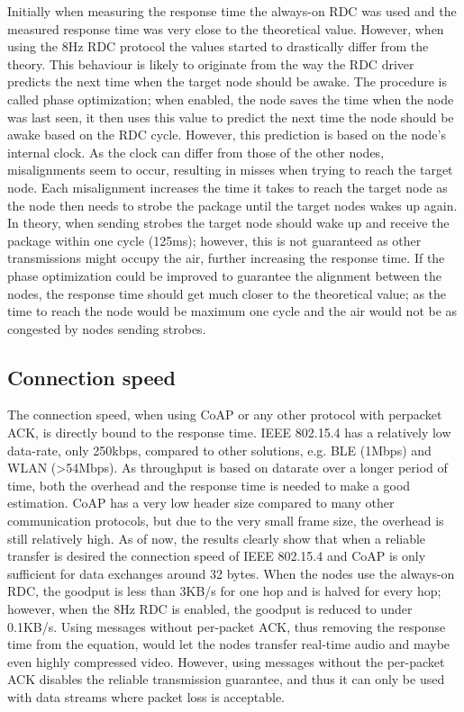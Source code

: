 Initially when measuring the response time the always-on RDC was used and the measured response time was very close to the theoretical value.
However,
	when using the 8Hz RDC protocol the values started to drastically differ from the theory.
This behaviour is likely to originate from the way the RDC driver predicts the next time when the target node should be awake.
The procedure is called phase optimization;
	when enabled,
	the node saves the time when the node was last seen,
	it then uses this value to predict the next time the node should be awake based on the RDC cycle.
However,
	this prediction is based on the node’s internal clock.
As the clock can differ from those of the other nodes,
	misalignments seem to occur,
	resulting in misses when trying to reach the target node.
Each misalignment increases the time it takes to reach the target node as the node then needs to strobe the package until the target nodes wakes up again.
In theory,
	when sending strobes the target node should wake up and receive the package within one cycle (125ms);
	however,
	this is not guaranteed as other transmissions might occupy the air,
	further increasing the response time.
If the phase optimization could be improved to guarantee the alignment between the nodes,
	the response time should get much closer to the theoretical value;
	as the time to reach the node would be maximum one cycle and the air would not be as congested by nodes sending strobes.

\subsection{Connection speed}

The connection speed,
	when using CoAP or any other protocol with perpacket ACK,
	is directly bound to the response time.
IEEE 802.15.4 has a relatively low data-rate,
	only 250kbps,
	compared to other solutions,
	e.g.
BLE (1Mbps) and WLAN (>54Mbps).
As throughput is based on datarate over a longer period of time,
	both the overhead and the response time is needed to make a good estimation.
CoAP has a very low header size compared to many other communication protocols,
	but due to the very small frame size,
	the overhead is still relatively high.
As of now,
	the results clearly show that when a reliable transfer is desired the connection speed of IEEE 802.15.4 and CoAP is only sufficient for data exchanges around 32 bytes.
When the nodes use the always-on RDC,
	the goodput is less than 3KB/s for one hop and is halved for every hop;
	however,
	when the 8Hz RDC is enabled,
	the goodput is reduced to under 0.1KB/s.
Using messages without per-packet ACK,
	thus removing the response time from the equation,
	would let the nodes transfer real-time audio and maybe even highly compressed video.
However,
	using messages without the per-packet ACK disables the reliable transmission guarantee,
	and thus it can only be used with data streams where packet loss is acceptable.


